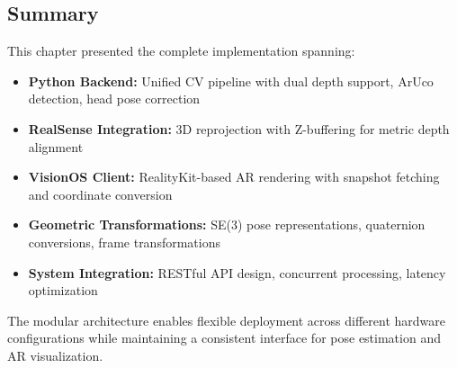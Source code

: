 \subsection{Summary}

This chapter presented the complete implementation spanning:

\begin{itemize}
    \item \textbf{Python Backend:} Unified CV pipeline with dual depth support, ArUco detection, head pose correction
    \item \textbf{RealSense Integration:} 3D reprojection with Z-buffering for metric depth alignment
    \item \textbf{VisionOS Client:} RealityKit-based AR rendering with snapshot fetching and coordinate conversion
    \item \textbf{Geometric Transformations:} SE(3) pose representations, quaternion conversions, frame transformations
    \item \textbf{System Integration:} RESTful API design, concurrent processing, latency optimization
\end{itemize}

The modular architecture enables flexible deployment across different hardware configurations while maintaining a consistent interface for pose estimation and AR visualization.
